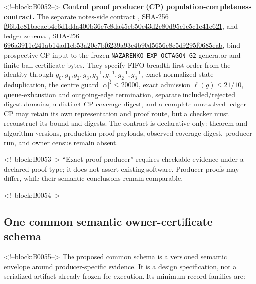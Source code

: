\documentclass[11pt,a4paper]{article}
\begin{document}
<!--block:B0052-->
\textbf{Control proof producer (CP) population-completeness contract.} The separate notes-side contract , SHA-256 \url{f96b1e81baeacb4e6d1dda400b36e7c8da45eb50c43d2c80d95c1c5c1e41c621}, and ledger schema , SHA-256 \url{696a3911e241ab14ad1eb53a20e7bf6239a93c4b90d5656c8c5d9295f0685eab}, bind prospective CP input to the frozen \texttt{NAZARENKO-EXP-OCTAGON-G2} generator and finite-ball certificate bytes. They specify FIFO breadth-first order from the identity through \(g_0,g_1,g_2,g_3,g_0^{-1},g_1^{-1},g_2^{-1},g_3^{-1}\), exact normalized-state deduplication, the centre guard \(\lvert\alpha\rvert^2\leq20000\), exact admission \(\ell(g)\leq21/10\), queue-exhaustion and outgoing-edge termination, separate included/rejected digest domains, a distinct CP coverage digest, and a complete unresolved ledger. CP may retain its own representation and proof route, but a checker must reconstruct its bound and digests. The contract is declarative only: theorem and algorithm versions, production proof payloads, observed coverage digest, producer run, and owner census remain absent.

<!--block:B0053-->
``Exact proof producer'' requires checkable evidence under a declared proof type; it does not assert existing software. Producer proofs may differ, while their semantic conclusions remain comparable.

<!--block:B0054-->
\hypertarget{one-common-semantic-owner-certificate-schema}{%
\subsection{One common semantic owner-certificate schema}\label{one-common-semantic-owner-certificate-schema}}

<!--block:B0055-->
The proposed common schema is a versioned semantic envelope around producer-specific evidence. It is a design specification, not a serialized artifact already frozen for execution. Its minimum record families are:
\end{document}
